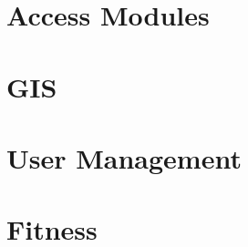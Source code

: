 \documentclass{article}
\begin{document}
\section{Access Modules}
	
\clearpage

\section{GIS}
	
\clearpage

\section{User Management}
	
\clearpage

\section{Fitness}
	
\end{document}
